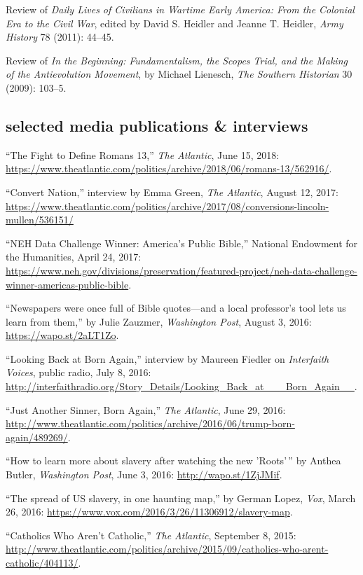 \documentclass[11pt]{article}
\begin{document}
Review of \emph{Daily Lives of Civilians in Wartime Early America: From
  the Colonial Era to the Civil War}, edited by David S. Heidler and
Jeanne T. Heidler, \emph{Army History} 78 (2011): 44--45.

Review of \emph{In the Beginning: Fundamentalism, the Scopes Trial, and
  the Making of the Antievolution Movement}, by Michael Lienesch,
\emph{The Southern Historian} 30 (2009): 103--5.

\subsection{selected media publications \& interviews}\label{public}

``The Fight to Define Romans 13,'' \emph{The Atlantic}, June 15, 2018: \url{https://www.theatlantic.com/politics/archive/2018/06/romans-13/562916/}.

``Convert Nation,'' interview by Emma Green, \emph{The Atlantic}, August 12, 
2017: \url{https://www.theatlantic.com/politics/archive/2017/08/conversions-lincoln-mullen/536151/}

``NEH Data Challenge Winner: America's Public Bible,'' National Endowment for 
the Humanities, April 24, 2017: 
\url{https://www.neh.gov/divisions/preservation/featured-project/neh-data-challenge-winner-americas-public-bible}.

``Newspapers were once full of Bible quotes---and a local professor's tool lets 
us learn from them,'' by Julie Zauzmer, \emph{Washington Post}, August 3, 2016: 
\url{https://wapo.st/2aLT1Zo}.

``Looking Back at Born Again,'' interview by Maureen Fiedler on \emph{Interfaith Voices}, public 
radio, July 8, 2016:  
\url{http://interfaithradio.org/Story_Details/Looking_Back_at___Born_Again__}.

``Just Another Sinner, Born Again,'' \emph{The Atlantic}, June 29, 2016: 
\url{http://www.theatlantic.com/politics/archive/2016/06/trump-born-again/489269/}.

``How to learn more about slavery after watching the new 'Roots'\,'' by Anthea Butler, \emph{Washington Post}, June 3, 2016: \url{http://wapo.st/1ZjJMif}.

``The spread of US slavery, in one haunting map,'' by German Lopez, 
\emph{Vox}, March 26, 2016: 
\url{https://www.vox.com/2016/3/26/11306912/slavery-map}.

``Catholics Who Aren't Catholic,'' \emph{The Atlantic}, September 8, 
2015:  
\url{http://www.theatlantic.com/politics/archive/2015/09/catholics-who-arent-catholic/404113/}.
\end{document}
